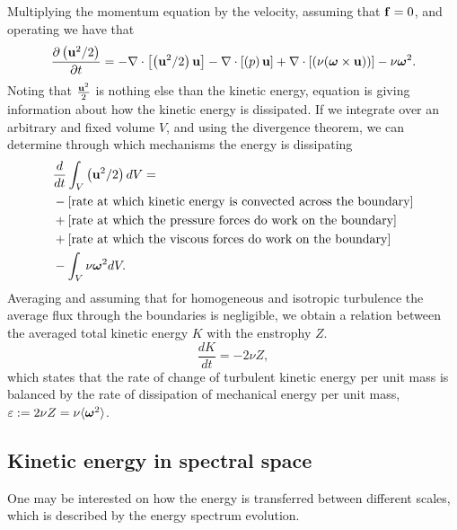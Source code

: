Multiplying the momentum equation  by the velocity, assuming that ${\bf f}=0$, and operating we have that
\begin{equation}
\label{eq-energy_equation}
\frac{\partial\left({\bf u}^2/2\right)}{\partial t}=-\nabla\cdot\left[\left({\bf u}^2/2\right){\bf u}\right]-\nabla\cdot\left[\left(p\right){\bf u}\right]+\nabla\cdot\left[\left(\nu(\boldsymbol{\omega}\times{\bf u})\right)\right]-\nu\boldsymbol{\omega}^2.
\end{equation}
Noting that $\frac{{\bf u}^2}{2}$ is nothing else than the kinetic energy, equation  is giving information about how the kinetic energy is dissipated. If we integrate  over an arbitrary and fixed volume $V$, and using the divergence theorem, we can determine through which mechanisms the energy is dissipating
\begin{align}
\label{eq-energy_dissipation}
&\frac{d}{dt}\int_V\left({\bf u}^2/2\right)dV=\\\nonumber
&-\left[\mbox{rate at which kinetic energy is convected across the boundary}\right]\\\nonumber
&+\left[\mbox{rate at which the pressure forces do work on the boundary}\right]\\\nonumber
&+\left[\mbox{rate at which the viscous forces do work on the boundary}\right]\\\nonumber
&-\int_V\nu\boldsymbol{\omega}^2dV.
\end{align}
Averaging  and assuming that for homogeneous and isotropic turbulence the average flux through the boundaries is negligible, we obtain a relation between the averaged total kinetic energy $K$ with the enstrophy $Z$.
\begin{equation}
\label{eq-energy_enstrophy}
\frac{d K}{dt}=-2\nu Z,
\end{equation}
which states that the rate of change of turbulent kinetic energy per unit mass is balanced by the rate of dissipation of mechanical energy per unit mass, $\varepsilon:=2\nu Z=\nu\langle\boldsymbol{\omega}^2\rangle$.

\subsection{Kinetic energy in spectral space}
\label{subsec-isotropic_kinetic_energy_spectral}
One may be interested on how the energy is transferred between different scales, which is described by the energy spectrum evolution.

